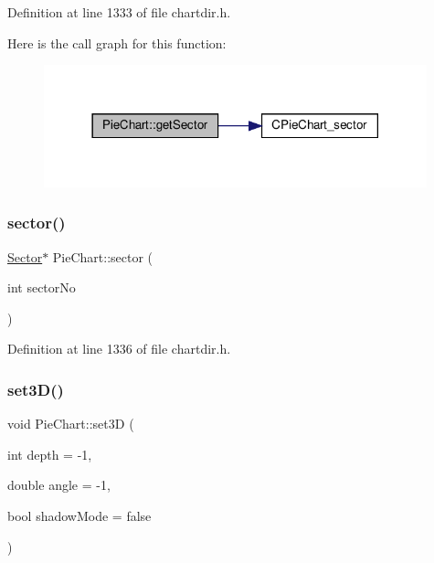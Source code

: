 Definition at line 1333 of file chartdir.\+h.

Here is the call graph for this function\+:
\nopagebreak
\begin{figure}[H]
\begin{center}
\leavevmode
\includegraphics[width=314pt]{class_pie_chart_a2fabcab450f4eddf29566a2fbbe3c67d_cgraph}
\end{center}
\end{figure}
\mbox{\label{class_pie_chart_afe2a0e5754abdd92bf9c03262a20568a}} 
\subsubsection{\texorpdfstring{sector()}{sector()}}
{\footnotesize\ttfamily \hyperlink{class_sector}{Sector}$\ast$ Pie\+Chart\+::sector (\begin{DoxyParamCaption}\item[{int}]{sector\+No }\end{DoxyParamCaption})\hspace{0.3cm}{\ttfamily [inline]}}



Definition at line 1336 of file chartdir.\+h.

\mbox{\label{class_pie_chart_aea66f80b6f025b2abdff9c768de1d32c}} 
\subsubsection{\texorpdfstring{set3\+D()}{set3D()}\hspace{0.1cm}{\footnotesize\ttfamily [1/2]}}
{\footnotesize\ttfamily void Pie\+Chart\+::set3D (\begin{DoxyParamCaption}\item[{int}]{depth = {\ttfamily -\/1},  }\item[{double}]{angle = {\ttfamily -\/1},  }\item[{bool}]{shadow\+Mode = {\ttfamily false} }\end{DoxyParamCaption})\hspace{0.3cm}{\ttfamily [inline]}}



